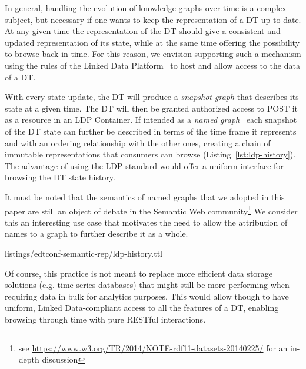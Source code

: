 In general, handling the evolution of knowledge graphs over time is a complex subject, but necessary if one wants to keep the representation of a DT up to date.
%
At any given time the representation of the DT should give a consistent and updated representation of its state, while at the same time offering the possibility to browse back in time.
%
For this reason, we envision supporting such a mechanism using the rules of the Linked Data Platform~\cite{Speicher:15:LDP} to host and allow access to the data of a DT.

With every state update, the DT will produce a \emph{snapshot graph} that describes its state at a given time.
%
The DT will then be granted authorized access to POST it as a resource in an LDP Container.
%
If intended as a \emph{named graph}~\cite{Carroll_Bizer_Hayes_Sticker:05} each snapshot of the DT state can further be described in terms of the time frame it represents and with an ordering relationship with the other ones, creating a chain of immutable representations that consumers can browse (Listing~\ref{lst:ldp-history}).
%
The advantage of using the LDP standard would
offer a uniform interface for browsing the DT state history.

It must be noted that the semantics of named graphs that we adopted in this paper are still an object of debate in the Semantic Web community\footnote{see \url{https://www.w3.org/TR/2014/NOTE-rdf11-datasets-20140225/} for an in-depth discussion}
%
We consider this an interesting use case that motivates the need to allow the attribution of names to a graph to further describe it as a whole.


    {listings/edtconf-semantic-rep/ldp-history.ttl}

Of course, this practice is not meant to replace more efficient data storage solutions (e.g. time series databases) that might still be more performing when requiring data in bulk for analytics purposes.
%
This would allow though to have uniform, Linked Data-compliant access to all the features of a DT, enabling browsing through time with pure RESTful interactions. 


